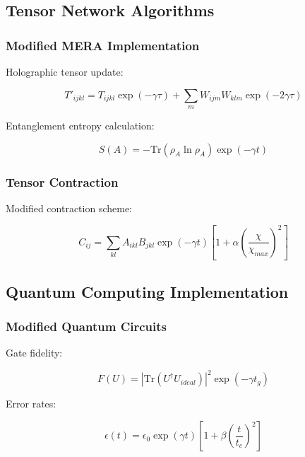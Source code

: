 \documentclass[12pt]{article}
\theoremstyle{plain}
\theoremstyle{definition}
\theoremstyle{remark}
\begin{document}
\subsection{Tensor Network Algorithms}

\subsubsection{Modified MERA Implementation}

Holographic tensor update:

\begin{equation}
T'_{ijkl} = T_{ijkl}\exp(-\gamma\tau) + \sum_m W_{ijm}W_{klm}\exp(-2\gamma\tau)
\end{equation}

Entanglement entropy calculation:

\begin{equation}
S(A) = -\text{Tr}(\rho_A\ln\rho_A)\exp(-\gamma t)
\end{equation}

\subsubsection{Tensor Contraction}

Modified contraction scheme:

\begin{equation}
C_{ij} = \sum_{kl} A_{ikl}B_{jkl}\exp(-\gamma t)\left[1 + \alpha\left(\frac{\chi}{\chi_{max}}\right)^2\right]
\end{equation}

\subsection{Quantum Computing Implementation}

\subsubsection{Modified Quantum Circuits}

Gate fidelity:

\begin{equation}
F(U) = |\text{Tr}(U^\dagger U_{ideal})|^2\exp(-\gamma t_g)
\end{equation}

Error rates:

\begin{equation}
\epsilon(t) = \epsilon_0\exp(\gamma t)\left[1 + \beta\left(\frac{t}{t_c}\right)^2\right]
\end{equation}
\end{document}
